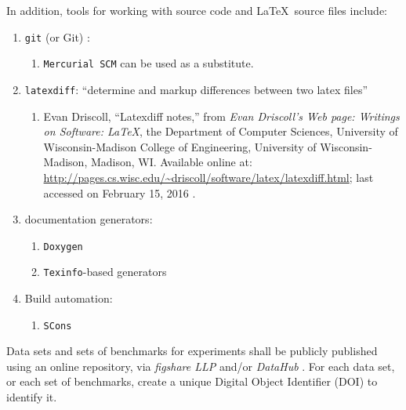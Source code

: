 \documentclass[letter,12pt]{article}
\begin{document}
In addition, tools for working with source code and \LaTeX\ source files include: \vspace{-0.3cm}
\begin{enumerate} \itemsep -4pt
\item {\tt git} (or Git) \cite{Hamano2014,Driscoll2012}: \vspace{-0.3cm}
	\begin{enumerate} \itemsep -2pt
	\item {\tt Mercurial SCM} \cite{MercurialContributors20XY,MercurialContributors20XYa,MercurialContributors2019,MercurialContributors2013,MercurialContributors2013a,DeMare2015,OSullivan2009,AtlassianStaff2018a} can be used as a substitute.
	\end{enumerate}
\item {\tt latexdiff}: ``determine and markup differences between two latex files'' \vspace{-0.3cm}
	\begin{enumerate} \itemsep -2pt
	\item Evan Driscoll, ``Latexdiff notes,'' from {\it Evan Driscoll's Web page: Writings on Software: \LaTeX}, the Department of Computer Sciences, University of Wisconsin-Madison College of Engineering, University of Wisconsin-Madison, Madison, WI. Available online at: \url{http://pages.cs.wisc.edu/~driscoll/software/latex/latexdiff.html}; last accessed on February 15, 2016 \cite{Driscoll20XYb}.
	\end{enumerate}
\item documentation generators: \vspace{-0.3cm}
	\begin{enumerate} \itemsep -2pt
	\item {\tt Doxygen} \cite{vanHeesch2016}
	\item {\tt Texinfo}-based generators \cite{WikipediaContributors2016h,Stallman2016,Stallman2016a,Stallman2016b}
	\end{enumerate}
\item Build automation: \vspace{-0.3cm}
	\begin{enumerate} \itemsep -2pt
	\item {\tt SCons} \cite{Driscoll20XY}
	\end{enumerate}
\end{enumerate}


Data sets and sets of benchmarks for experiments shall be publicly published using an online repository, via {\it figshare LLP} \cite{figshareLLPstaff2016} and/or {\it DataHub} \cite{DatopianAtomaticLtdIncStaff2017}. For each data set, or each set of benchmarks, create a unique Digital Object Identifier (DOI) \cite{InternationalDOIFoundationStaff2017} to identify it. \\
\end{document}
